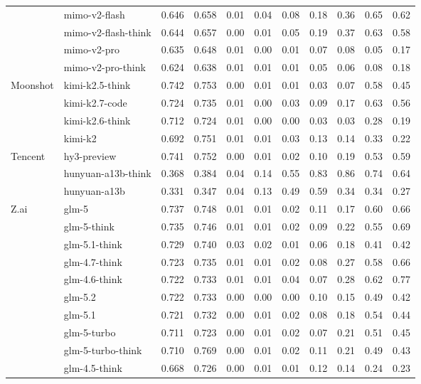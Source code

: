 \begin{longtable}{@{}ll rr rrrrrrr@{}}
 & mimo-v2-flash & 0.646 & 0.658 & 0.01 & 0.04 & 0.08 & 0.18 & 0.36 & 0.65 & 0.62 \\
 & mimo-v2-flash-think & 0.644 & 0.657 & 0.00 & 0.01 & 0.05 & 0.19 & 0.37 & 0.63 & 0.58 \\
 & mimo-v2-pro & 0.635 & 0.648 & 0.01 & 0.00 & 0.01 & 0.07 & 0.08 & 0.05 & 0.17 \\
 & mimo-v2-pro-think & 0.624 & 0.638 & 0.01 & 0.01 & 0.01 & 0.05 & 0.06 & 0.08 & 0.18 \\
Moonshot & kimi-k2.5-think & 0.742 & 0.753 & 0.00 & 0.01 & 0.01 & 0.03 & 0.07 & 0.58 & 0.45 \\
 & kimi-k2.7-code & 0.724 & 0.735 & 0.01 & 0.00 & 0.03 & 0.09 & 0.17 & 0.63 & 0.56 \\
 & kimi-k2.6-think & 0.712 & 0.724 & 0.01 & 0.00 & 0.00 & 0.03 & 0.03 & 0.28 & 0.19 \\
 & kimi-k2 & 0.692 & 0.751 & 0.01 & 0.01 & 0.03 & 0.13 & 0.14 & 0.33 & 0.22 \\
Tencent & hy3-preview & 0.741 & 0.752 & 0.00 & 0.01 & 0.02 & 0.10 & 0.19 & 0.53 & 0.59 \\
 & hunyuan-a13b-think & 0.368 & 0.384 & 0.04 & 0.14 & 0.55 & 0.83 & 0.86 & 0.74 & 0.64 \\
 & hunyuan-a13b & 0.331 & 0.347 & 0.04 & 0.13 & 0.49 & 0.59 & 0.34 & 0.34 & 0.27 \\
Z.ai & glm-5 & 0.737 & 0.748 & 0.01 & 0.01 & 0.02 & 0.11 & 0.17 & 0.60 & 0.66 \\
 & glm-5-think & 0.735 & 0.746 & 0.01 & 0.01 & 0.02 & 0.09 & 0.22 & 0.55 & 0.69 \\
 & glm-5.1-think & 0.729 & 0.740 & 0.03 & 0.02 & 0.01 & 0.06 & 0.18 & 0.41 & 0.42 \\
 & glm-4.7-think & 0.723 & 0.735 & 0.01 & 0.01 & 0.02 & 0.08 & 0.27 & 0.58 & 0.66 \\
 & glm-4.6-think & 0.722 & 0.733 & 0.01 & 0.01 & 0.04 & 0.07 & 0.28 & 0.62 & 0.77 \\
 & glm-5.2 & 0.722 & 0.733 & 0.00 & 0.00 & 0.00 & 0.10 & 0.15 & 0.49 & 0.42 \\
 & glm-5.1 & 0.721 & 0.732 & 0.00 & 0.01 & 0.02 & 0.08 & 0.18 & 0.54 & 0.44 \\
 & glm-5-turbo & 0.711 & 0.723 & 0.00 & 0.01 & 0.02 & 0.07 & 0.21 & 0.51 & 0.45 \\
 & glm-5-turbo-think & 0.710 & 0.769 & 0.00 & 0.01 & 0.02 & 0.11 & 0.21 & 0.49 & 0.43 \\
 & glm-4.5-think & 0.668 & 0.726 & 0.00 & 0.01 & 0.01 & 0.12 & 0.14 & 0.24 & 0.23 \\

\end{longtable}

